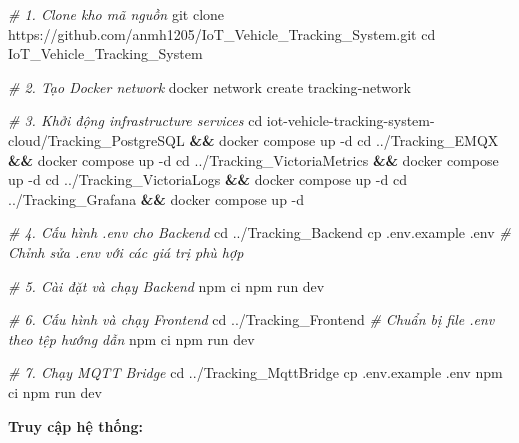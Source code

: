 \documentclass[a4paper]{extarticle}
\newenvironment{Shaded}{}{}
\newcommand{\AttributeTok}[1]{\textcolor[rgb]{0.49,0.56,0.16}{#1}}
\newcommand{\BuiltInTok}[1]{\textcolor[rgb]{0.00,0.50,0.00}{#1}}
\newcommand{\CommentTok}[1]{\textcolor[rgb]{0.38,0.63,0.69}{\textit{#1}}}
\newcommand{\ExtensionTok}[1]{#1}
\newcommand{\FunctionTok}[1]{\textcolor[rgb]{0.02,0.16,0.49}{#1}}
\newcommand{\KeywordTok}[1]{\textcolor[rgb]{0.00,0.44,0.13}{\textbf{#1}}}
\newcommand{\NormalTok}[1]{#1}
\begin{document}
\begin{Shaded}
\begin{Highlighting}[]
\CommentTok{\# 1. Clone kho mã nguồn}
\FunctionTok{git}\NormalTok{ clone https://github.com/anmh1205/IoT\_Vehicle\_Tracking\_System.git}
\BuiltInTok{cd}\NormalTok{ IoT\_Vehicle\_Tracking\_System}

\CommentTok{\# 2. Tạo Docker network}
\ExtensionTok{docker}\NormalTok{ network create tracking{-}network}

\CommentTok{\# 3. Khởi động infrastructure services}
\BuiltInTok{cd}\NormalTok{ iot{-}vehicle{-}tracking{-}system{-}cloud/Tracking\_PostgreSQL }\KeywordTok{\&\&} \ExtensionTok{docker}\NormalTok{ compose up }\AttributeTok{{-}d}
\BuiltInTok{cd}\NormalTok{ ../Tracking\_EMQX }\KeywordTok{\&\&} \ExtensionTok{docker}\NormalTok{ compose up }\AttributeTok{{-}d}
\BuiltInTok{cd}\NormalTok{ ../Tracking\_VictoriaMetrics }\KeywordTok{\&\&} \ExtensionTok{docker}\NormalTok{ compose up }\AttributeTok{{-}d}
\BuiltInTok{cd}\NormalTok{ ../Tracking\_VictoriaLogs }\KeywordTok{\&\&} \ExtensionTok{docker}\NormalTok{ compose up }\AttributeTok{{-}d}
\BuiltInTok{cd}\NormalTok{ ../Tracking\_Grafana }\KeywordTok{\&\&} \ExtensionTok{docker}\NormalTok{ compose up }\AttributeTok{{-}d}

\CommentTok{\# 4. Cấu hình .env cho Backend}
\BuiltInTok{cd}\NormalTok{ ../Tracking\_Backend}
\FunctionTok{cp}\NormalTok{ .env.example .env}
\CommentTok{\# Chỉnh sửa .env với các giá trị phù hợp}

\CommentTok{\# 5. Cài đặt và chạy Backend}
\ExtensionTok{npm}\NormalTok{ ci}
\ExtensionTok{npm}\NormalTok{ run dev}

\CommentTok{\# 6. Cấu hình và chạy Frontend}
\BuiltInTok{cd}\NormalTok{ ../Tracking\_Frontend}
\CommentTok{\# Chuẩn bị file .env theo tệp hướng dẫn}
\ExtensionTok{npm}\NormalTok{ ci}
\ExtensionTok{npm}\NormalTok{ run dev}

\CommentTok{\# 7. Chạy MQTT Bridge}
\BuiltInTok{cd}\NormalTok{ ../Tracking\_MqttBridge}
\FunctionTok{cp}\NormalTok{ .env.example .env}
\ExtensionTok{npm}\NormalTok{ ci}
\ExtensionTok{npm}\NormalTok{ run dev}
\end{Highlighting}
\end{Shaded}

\textbf{Truy cập hệ thống:}
\end{document}
